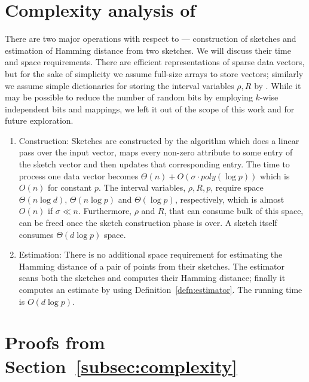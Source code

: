 \section{Complexity analysis of \fsketch}\label{subsec:appendix-complexity}
There
are two major operations with respect to \fsketch --- construction of sketches
and estimation of Hamming distance from two sketches. We will discuss their time and space requirements. There are efficient representations of sparse data vectors, but for the sake of simplicity we assume full-size arrays to store vectors; similarly we assume simple dictionaries for storing the interval variables $\rho,R$ by \fsketch. While it may be possible to reduce the number of random bits by employing $k$-wise independent bits and mappings, we left it out of the scope of this work and for future exploration.
\begin{enumerate}
    \item{Construction:} Sketches are constructed by the \fsketch algorithm which does a linear pass over the input vector, maps every non-zero attribute to some entry of the sketch vector and then updates that corresponding entry. The time to process one data vector becomes $\Theta(n) + O(\sigma \cdot poly(\log p))$ which is $O(n)$ for constant $p$. The interval variables, $\rho,R,p$, require space $\Theta(n \log d)$, $\Theta(n \log p)$ and $\Theta(\log p)$, respectively, which is almost $O(n)$ if $\sigma \ll n$. Furthermore, $\rho$ and $R$, that can consume bulk of this space, can be freed once the sketch construction phase is over. A sketch itself consumes $\Theta(d \log p)$ space.
    \item{Estimation:} There is no additional space requirement for estimating the Hamming distance of a pair of points from their sketches. The estimator scans both the sketches and computes their Hamming distance; finally it computes an estimate by using Definition~\ref{defn:estimator}. The running time is $O(d \log p)$.
\end{enumerate}



\section{Proofs from Section~\ref{subsec:complexity}}\label{appendix:subsec:complexity}

\sparsitylemma*

